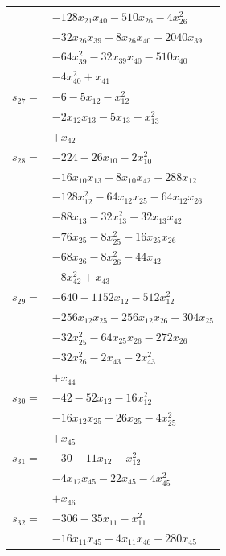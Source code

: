 \begin{longtable}{@{}r@{\;}l@{}}
 & \(\displaystyle -128x_{21}x_{40} -510x_{26} -4x_{26}^{2}\) \\
 & \(\displaystyle -32x_{26}x_{39} -8x_{26}x_{40} -2040x_{39}\) \\
 & \(\displaystyle -64x_{39}^{2} -32x_{39}x_{40} -510x_{40}\) \\
 & \(\displaystyle -4x_{40}^{2} +x_{41}\) \\[3pt]
\(s_{27}=\) & \(\displaystyle -6 -5x_{12} -x_{12}^{2}\) \\
 & \(\displaystyle -2x_{12}x_{13} -5x_{13} -x_{13}^{2}\) \\
 & \(\displaystyle +x_{42}\) \\[3pt]
\(s_{28}=\) & \(\displaystyle -224 -26x_{10} -2x_{10}^{2}\) \\
 & \(\displaystyle -16x_{10}x_{13} -8x_{10}x_{42} -288x_{12}\) \\
 & \(\displaystyle -128x_{12}^{2} -64x_{12}x_{25} -64x_{12}x_{26}\) \\
 & \(\displaystyle -88x_{13} -32x_{13}^{2} -32x_{13}x_{42}\) \\
 & \(\displaystyle -76x_{25} -8x_{25}^{2} -16x_{25}x_{26}\) \\
 & \(\displaystyle -68x_{26} -8x_{26}^{2} -44x_{42}\) \\
 & \(\displaystyle -8x_{42}^{2} +x_{43}\) \\[3pt]
\(s_{29}=\) & \(\displaystyle -640 -1152x_{12} -512x_{12}^{2}\) \\
 & \(\displaystyle -256x_{12}x_{25} -256x_{12}x_{26} -304x_{25}\) \\
 & \(\displaystyle -32x_{25}^{2} -64x_{25}x_{26} -272x_{26}\) \\
 & \(\displaystyle -32x_{26}^{2} -2x_{43} -2x_{43}^{2}\) \\
 & \(\displaystyle +x_{44}\) \\[3pt]
\(s_{30}=\) & \(\displaystyle -42 -52x_{12} -16x_{12}^{2}\) \\
 & \(\displaystyle -16x_{12}x_{25} -26x_{25} -4x_{25}^{2}\) \\
 & \(\displaystyle +x_{45}\) \\[3pt]
\(s_{31}=\) & \(\displaystyle -30 -11x_{12} -x_{12}^{2}\) \\
 & \(\displaystyle -4x_{12}x_{45} -22x_{45} -4x_{45}^{2}\) \\
 & \(\displaystyle +x_{46}\) \\[3pt]
\(s_{32}=\) & \(\displaystyle -306 -35x_{11} -x_{11}^{2}\) \\
 & \(\displaystyle -16x_{11}x_{45} -4x_{11}x_{46} -280x_{45}\) \\

\end{longtable}
